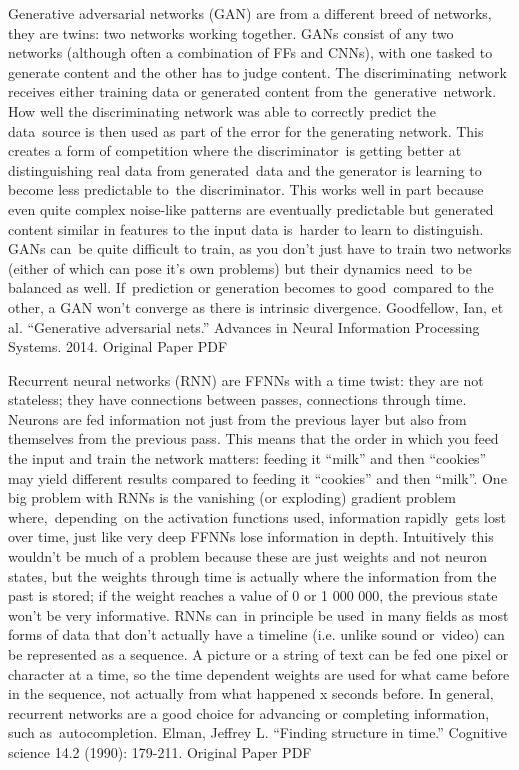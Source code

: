 \documentclass[11pt,a4paper,oneside]{ctexbook}
\begin{document}
Generative adversarial networks (GAN) are from a different breed of networks, they are twins: two networks working together. GANs consist of any two networks (although often a combination of FFs and CNNs), with one tasked to generate content and the other has to judge content. The discriminating network receives either training data or generated content from the generative network. How well the discriminating network was able to correctly predict the data source is then used as part of the error for the generating network. This creates a form of competition where the discriminator is getting better at distinguishing real data from generated data and the generator is learning to become less predictable to the discriminator. This works well in part because even quite complex noise-like patterns are eventually predictable but generated content similar in features to the input data is harder to learn to distinguish. GANs can be quite difficult to train, as you don’t just have to train two networks (either of which can pose it’s own problems) but their dynamics need to be balanced as well. If prediction or generation becomes to good compared to the other, a GAN won’t converge as there is intrinsic divergence.
Goodfellow, Ian, et al. “Generative adversarial nets.” Advances in Neural Information Processing Systems. 2014.
Original Paper PDF


Recurrent neural networks (RNN) are FFNNs with a time twist: they are not stateless; they have connections between passes, connections through time. Neurons are fed information not just from the previous layer but also from themselves from the previous pass. This means that the order in which you feed the input and train the network matters: feeding it “milk” and then “cookies” may yield different results compared to feeding it “cookies” and then “milk”. One big problem with RNNs is the vanishing (or exploding) gradient problem where, depending on the activation functions used, information rapidly gets lost over time, just like very deep FFNNs lose information in depth. Intuitively this wouldn’t be much of a problem because these are just weights and not neuron states, but the weights through time is actually where the information from the past is stored; if the weight reaches a value of 0 or 1 000 000, the previous state won’t be very informative. RNNs can in principle be used in many fields as most forms of data that don’t actually have a timeline (i.e. unlike sound or video) can be represented as a sequence. A picture or a string of text can be fed one pixel or character at a time, so the time dependent weights are used for what came before in the sequence, not actually from what happened x seconds before. In general, recurrent networks are a good choice for advancing or completing information, such as autocompletion.
Elman, Jeffrey L. “Finding structure in time.” Cognitive science 14.2 (1990): 179-211.
Original Paper PDF
\end{document}
